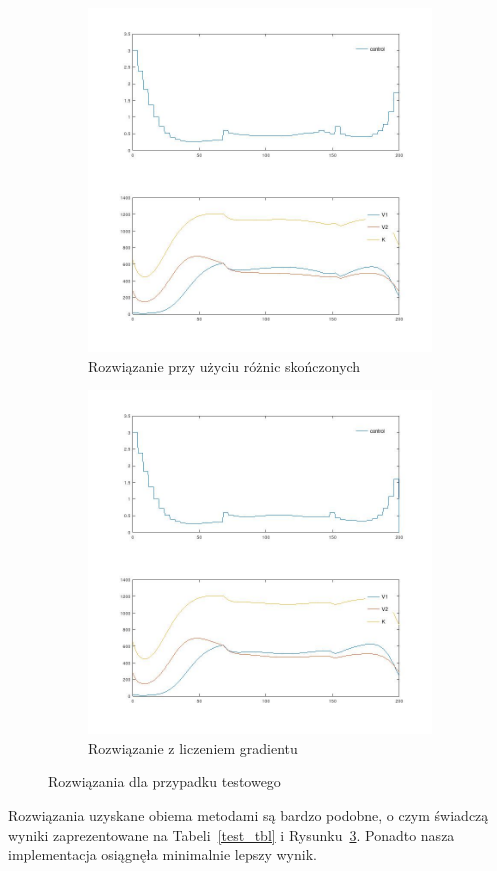 \documentclass[11pt]{article}
\begin{document}
\begin{figure}[h]
  \begin{subfigure}{.5\textwidth}
    \caption{Rozwiązanie przy użyciu różnic skończonych}\label{nograd_sol}
    \includegraphics[width=\textwidth]{../plots/plot_nograd}
  \end{subfigure}
  \begin{subfigure}{.5\textwidth}
    \caption{Rozwiązanie z liczeniem gradientu}\label{test_sol}
    \includegraphics[width=\textwidth]{../plots/plot_test}
  \end{subfigure}%
  \caption{Rozwiązania dla przypadku testowego}\label{test_nograd_sol}
\end{figure}
Rozwiązania uzyskane obiema metodami są bardzo podobne, o czym świadczą wyniki zaprezentowane na Tabeli~\ref{test_tbl} i Rysunku~\ref{test_nograd_sol}. Ponadto nasza implementacja osiągnęła minimalnie lepszy wynik.
\end{document}
